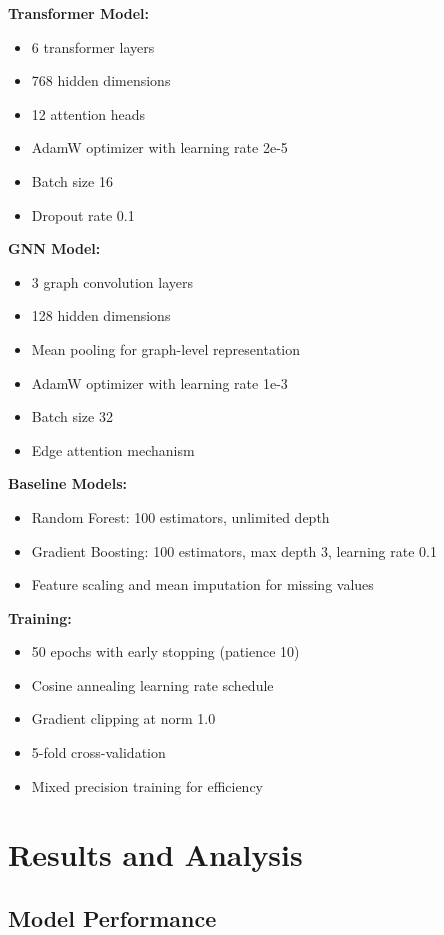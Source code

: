 \documentclass[10pt,twocolumn,letterpaper]{article}
\begin{document}
\textbf{Transformer Model:}
\begin{itemize}
    \item 6 transformer layers
    \item 768 hidden dimensions
    \item 12 attention heads
    \item AdamW optimizer with learning rate 2e-5
    \item Batch size 16
    \item Dropout rate 0.1
\end{itemize}

\textbf{GNN Model:}
\begin{itemize}
    \item 3 graph convolution layers
    \item 128 hidden dimensions
    \item Mean pooling for graph-level representation
    \item AdamW optimizer with learning rate 1e-3
    \item Batch size 32
    \item Edge attention mechanism
\end{itemize}

\textbf{Baseline Models:}
\begin{itemize}
    \item Random Forest: 100 estimators, unlimited depth
    \item Gradient Boosting: 100 estimators, max depth 3, learning rate 0.1
    \item Feature scaling and mean imputation for missing values
\end{itemize}

\textbf{Training:}
\begin{itemize}
    \item 50 epochs with early stopping (patience 10)
    \item Cosine annealing learning rate schedule
    \item Gradient clipping at norm 1.0
    \item 5-fold cross-validation
    \item Mixed precision training for efficiency
\end{itemize}

\section{Results and Analysis}

\subsection{Model Performance}
\end{document}
